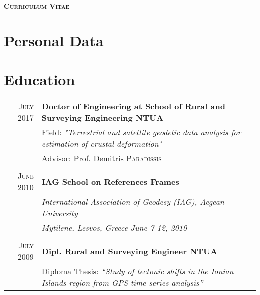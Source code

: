 \documentclass[a4paper]{Classes/cv_prof_en} %
\begin{document}




\par{\centering
                {\textbf{ \Large{ \textsc{Curriculum Vitae}}}
        }\bigskip\\}\par
\section{Personal Data}

\cvpersonalinfo

\section{Education}
\begin{tabular}{rp{14cm}}
 \textsc{July} 2017 &\textbf{Doctor of Engineering at School of Rural and Surveying Engineering NTUA}\\
& Field: \textit{"Terrestrial and satellite geodetic data analysis for estimation of crustal deformation"} \\
& \small Advisor: Prof. Demitris \textsc{Paradissis}\\&\\
 \textsc{June} 2010 & \textbf{IAG School on References Frames}\\
& \textit{International Association of Geodesy (IAG), Aegean University}\\
& \textit{Mytilene, Lesvos, Greece June 7-12, 2010}\\&\\
\textsc{July} 2009&\textbf{Dipl. Rural and Surveying Engineer NTUA}\\
& Diploma Thesis: \textit{``Study of tectonic shifts in the Ionian Islands region from GPS time series analysis''}\\
\end{tabular}
\end{document}
